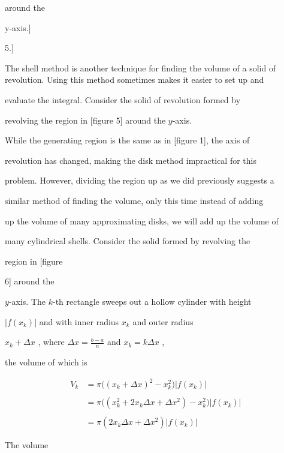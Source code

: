 
around the

y-axis.]


5.]



The shell method is another technique for finding the volume of a solid of revolution. Using this method sometimes makes it easier to set up and

evaluate the integral. Consider the solid of revolution formed by

revolving the region in [figure 5] around the $y$-axis.

While the generating region is the same as in [figure 1], the axis of

revolution has changed, making the disk method impractical for this

problem. However, dividing the region up as we did previously suggests a

similar method of finding the volume, only this time instead of adding

up the volume of many approximating disks, we will add up the volume of

many cylindrical shells. Consider the solid formed by revolving the

region in [figure

6] around the

$y$-axis. The $k$-th rectangle sweeps out a hollow cylinder with height

$\Big|f(x _k)\Big|$ and with inner radius $x _k$ and outer radius

$x _k+\Delta x$ , where $\Delta x=\frac{b-a}{n}$ and $x _k=k\Delta x$ ,

the volume of which is



\begin{align} V _k &= \pi\bigl((x _k+\Delta x)^2 - x _k^2\bigr)\Big|f(x _k)\Big| \\\\ &= \pi\bigl((x _k^2 + 2x _k\Delta x + \Delta x^2) - x _k^2\bigr)\Big|f(x _k)\Big| \\\\ &= \pi(2x _k\Delta x + \Delta x^2)\Big|f(x _k)\Big| \end{align} 

The volume

